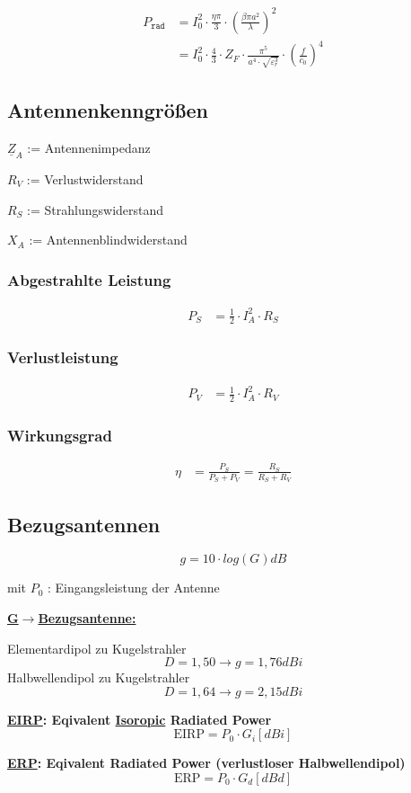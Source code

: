 \begin{align*}
    P_\texttt{rad} & = I_0^2\cdot\frac{\eta\pi}{3}\cdot\left(\frac{\beta\pi a^2}{\lambda}\right)^2                                      \\
                   & = I_0^2\cdot\frac{4}{3}\cdot Z_F\cdot\frac{\pi^5}{a^4\cdot\sqrt{\varepsilon_r^3}}\cdot\left(\frac{f}{c_0}\right)^4
\end{align*}

\subsection{Antennenkenngrößen}


$\underline{Z}_A$ := Antennenimpedanz

$R_V$ := Verlustwiderstand

$R_S$ := Strahlungswiderstand

$X_A$ := Antennenblindwiderstand

\subsubsection{Abgestrahlte Leistung}
\begin{align*}
    P_S & = \frac{1}{2}\cdot I_A^2 \cdot R_S
\end{align*}
\subsubsection{Verlustleistung}
\begin{align*}
    P_V & = \frac{1}{2}\cdot I_A^2\cdot R_V
\end{align*}
\subsubsection{Wirkungsgrad}
\begin{align*}
    \eta & = \frac{P_S}{P_S + P_V} = \frac{R_S}{R_S + R_V}
\end{align*}
\subsection{Bezugsantennen}
\[
    \boxed{g = 10 \cdot log(G)dB}
\]

mit $P_0$ : Eingangsleistung der Antenne

\begin{description}
    \item \textbf{\underline{G$\rightarrow$Bezugsantenne:}}

          Elementardipol  zu Kugelstrahler \[D = 1,50 \rightarrow g = 1,76\si{dBi}\]
          Halbwellendipol zu Kugelstrahler \[D = 1,64 \rightarrow g = 2,15\si{dBi}\]

    \item \textbf{\underline{EIRP}: Eqivalent \underline{Isoropic} Radiated Power}
          \[
              \text{EIRP} = P_0 \cdot G_i [dBi]
          \]

    \item \textbf{\underline{ERP}: Eqivalent Radiated Power (verlustloser Halbwellendipol)}
          \[
              \text{ERP} = P_0 \cdot G_d [dBd]
          \]
\end{description}
